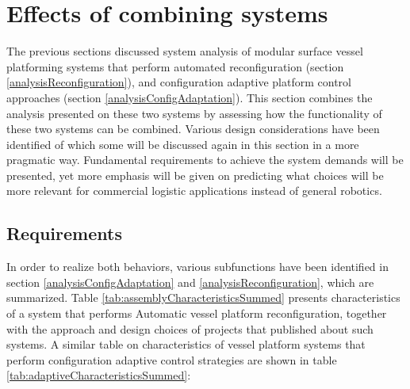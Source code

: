 \section{Effects of combining systems}
\label{analysisCombined}
The previous sections discussed system analysis of modular surface vessel platforming systems that perform automated reconfiguration (section \ref{analysisReconfiguration}), and configuration adaptive platform control approaches (section \ref{analysisConfigAdaptation}).
This section combines the analysis presented on these two systems by assessing how the functionality of these two systems can be combined. Various design considerations have been identified of which some will be discussed again in this section in a more pragmatic way. Fundamental requirements to achieve the system demands will be presented, yet more emphasis will be given on predicting what choices will be more relevant for commercial logistic applications instead of general robotics. 


\subsection{Requirements}
In order to realize both behaviors, various subfunctions have been identified in section \ref{analysisConfigAdaptation} and \ref{analysisReconfiguration}, which are summarized. Table \ref{tab:assemblyCharacteristicsSummed} presents characteristics of a system that performs Automatic vessel platform reconfiguration, together with the approach and design choices of projects that published about such systems. A similar table on characteristics of vessel platform systems that perform configuration adaptive control strategies are shown in table \ref{tab:adaptiveCharacteristicsSummed}:

